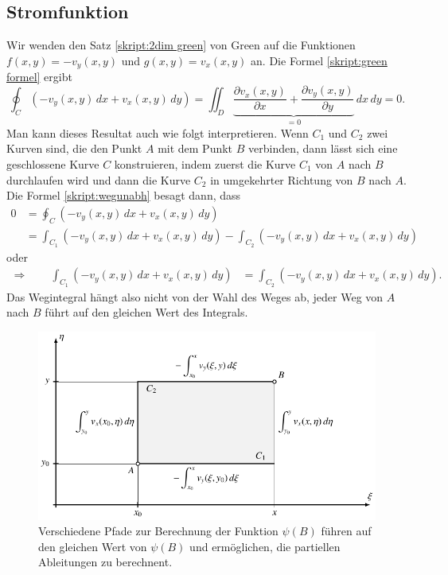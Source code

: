 \subsection{Stromfunktion}
Wir wenden den Satz \ref{skript:2dim green} von Green auf die
Funktionen $f(x,y)=-v_y(x,y)$ und $g(x,y)=v_x(x,y)$ an.
Die Formel \eqref{skript:green formel} ergibt
\begin{equation}
\oint_C (-v_y(x,y)\,dx + v_x(x,y)\,dy)
=
\iint_D
\underbrace{
\frac{\partial v_x(x,y)}{\partial x}
+
\frac{\partial v_y(x,y)}{\partial y}
}_{\displaystyle=0}
\,dx\,dy
=
0.
\label{skript:wegunabh}
\end{equation}
Man kann dieses Resultat auch wie folgt interpretieren.
Wenn $C_1$ und $C_2$ zwei Kurven sind, die den Punkt $A$ mit dem Punkt $B$
verbinden, dann lässt sich eine geschlossene Kurve $C$ konstruieren, indem
zuerst die Kurve $C_1$ von $A$ nach $B$ durchlaufen wird und dann die
Kurve $C_2$ in umgekehrter Richtung von $B$ nach $A$.
Die Formel \eqref{skript:wegunabh} besagt dann, dass 
\begin{align*}
0
&=
\oint_{C} (-v_y(x,y)\,dx + v_x(x,y)\,dy)
\\
&=
\int_{C_1} (-v_y(x,y)\,dx + v_x(x,y)\,dy)
-
\int_{C_2} (-v_y(x,y)\,dx + v_x(x,y)\,dy)
\end{align*}
oder
\begin{align*}
\Rightarrow
\qquad
\int_{C_1} (-v_y(x,y)\,dx + v_x(x,y)\,dy)
&=
\int_{C_2} (-v_y(x,y)\,dx + v_x(x,y)\,dy).
\end{align*}
Das Wegintegral hängt also nicht von der Wahl des Weges ab, jeder Weg
von $A$ nach $B$ führt auf den gleichen Wert des Integrals.

\begin{figure}
\centering
\includegraphics{chapters/2/green-curves.pdf}
\caption{Verschiedene Pfade zur Berechnung der Funktion $\psi(B)$
führen auf den gleichen Wert von $\psi(B)$ und ermöglichen, die partiellen
Ableitungen zu berechnent.
\label{skript:psi-pfade}}
\end{figure}

